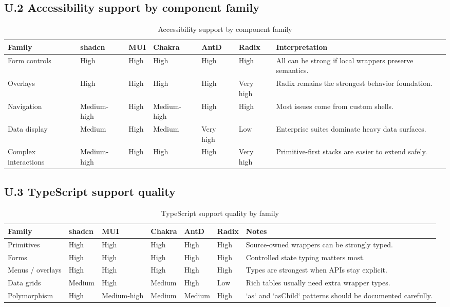 \subsection*{U.2 Accessibility support by component family}
\begin{table}[htbp]
  \centering
  \caption{Accessibility support by component family}
  \begin{tabularx}{\textwidth}{@{}p{}p{}p{}p{}p{}p{}Y@{}}
    \toprule
    \textbf{Family} & \textbf{shadcn} & \textbf{MUI} & \textbf{Chakra} & \textbf{AntD} & \textbf{Radix} & \textbf{Interpretation} \\
    \midrule
    Form controls & High & High & High & High & High & All can be strong if local wrappers preserve semantics. \\
    Overlays & High & High & High & High & Very high & Radix remains the strongest behavior foundation. \\
    Navigation & Medium-high & High & Medium-high & High & High & Most issues come from custom shells. \\
    Data display & Medium & High & Medium & Very high & Low & Enterprise suites dominate heavy data surfaces. \\
    Complex interactions & Medium-high & High & High & High & Very high & Primitive-first stacks are easier to extend safely. \\
    \bottomrule
  \end{tabularx}
\end{table}

\subsection*{U.3 TypeScript support quality}
\begin{table}[htbp]
  \centering
  \caption{TypeScript support quality by family}
  \begin{tabularx}{\textwidth}{@{}p{}p{}p{}p{}p{}p{}Y@{}}
    \toprule
    \textbf{Family} & \textbf{shadcn} & \textbf{MUI} & \textbf{Chakra} & \textbf{AntD} & \textbf{Radix} & \textbf{Notes} \\
    \midrule
    Primitives & High & High & High & High & High & Source-owned wrappers can be strongly typed. \\
    Forms & High & High & High & High & High & Controlled state typing matters most. \\
    Menus / overlays & High & High & High & High & High & Types are strongest when APIs stay explicit. \\
    Data grids & Medium & High & Medium & High & Low & Rich tables usually need extra wrapper types. \\
    Polymorphism & High & Medium-high & Medium & Medium & High & `as` and `asChild` patterns should be documented carefully. \\
    \bottomrule
  \end{tabularx}
\end{table}

